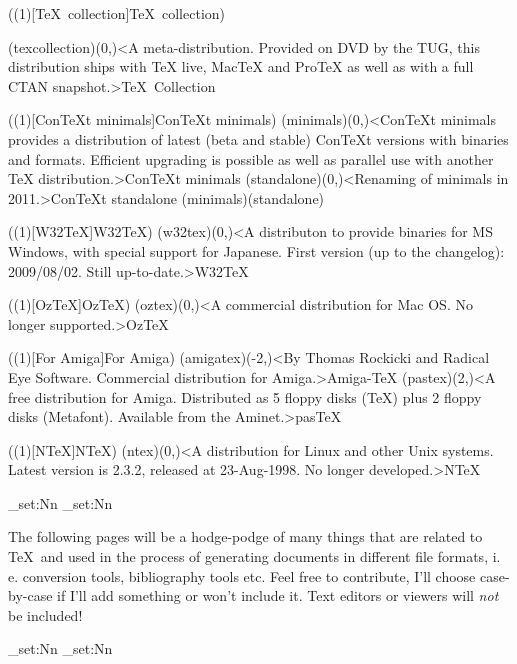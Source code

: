\tograph(\tostruct(1)[\TeX\ collection]{\TeX\ collection}){
	\tonode(texcollection)(0,\layer)<A meta-distribution. Provided on DVD by the TUG, this distribution ships with TeX live, MacTeX and ProTeX as well as with a full CTAN snapshot.>{\TeX\ Collection}

}

\tograph(\tostruct(1)[Con\TeX t minimals]{Con\TeX t minimals}){
	\tonode(minimals)(0,\layer)<ConTeXt minimals provides a distribution of latest (beta and stable) ConTeXt versions with binaries and formats. Efficient upgrading is possible as well as parallel use with another TeX distribution.>{Con\TeX t minimals}
	\steplayer
	\tonode(standalone)(0,\layer)<Renaming of minimals in 2011.>{Con\TeX t standalone}
	\todraw(minimals)(standalone)
}

\tograph(\tostruct(1)[W32\TeX]{W32\TeX}){
	\tonode(w32tex)(0,\layer)<A distributon to provide binaries for MS Windows, with special support for Japanese. First version (up to the changelog): 2009/08/02. Still up-to-date.>{W32\TeX}
}

\tograph(\tostruct(1)[OzTeX]{OzTeX}){
	\tonode[\histdistro](oztex)(0,\layer)<A commercial distribution for Mac OS. No longer supported.>{Oz\TeX}
}

\tograph(\tostruct(1)[For Amiga]{For Amiga}){
	\tonode[\histdistro](amigatex)(-2,\layer)<By Thomas Rockicki and Radical Eye Software. Commercial distribution for Amiga.>{Amiga-TeX}
	\tonode[\histdistro](pastex)(2,\layer)<A free distribution for Amiga. Distributed as 5 floppy disks (TeX) plus 2 floppy disks (Metafont). Available from the Aminet.>{pasTeX}
}

\tograph(\tostruct(1)[N\TeX]{N\TeX}){
	\tonode[\histdistro](ntex)(0,\layer)<A distribution for Linux and other Unix systems. Latest version is 2.3.2, released at 23-Aug-1998. No longer developed.>{N\TeX}
}

\newpage
\ExplSyntaxOn
  \dim_set:Nn\pdfpagewidth{13cm}       %
  \dim_set:Nn\pdfpageheight{6cm}
\ExplSyntaxOff
\newpage
{}
\parbox{\textwidth}{\normalsize
The following pages will be a hodge-podge of many things that are related to \TeX\ and used in the process of generating documents in different file formats, i.\,e. conversion tools, bibliography tools etc. Feel free to contribute, I'll choose case-by-case if I'll add something or won't include it. Text editors or viewers will \emph{not} be included!
}
  \restoregeometry
\ExplSyntaxOn
  \dim_set:Nn\pdfpagewidth{21cm}     %
  \dim_set:Nn\pdfpageheight{29.7cm}
\ExplSyntaxOff

